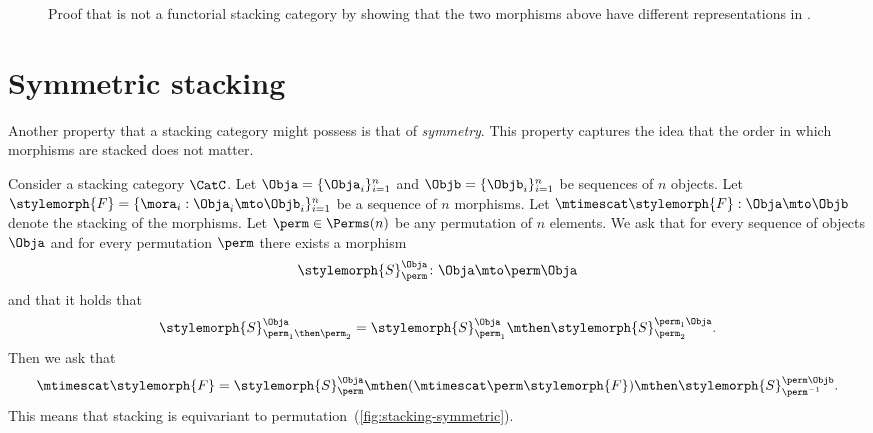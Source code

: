 \begin{figure*}[b]
	\centering
	\caption{Proof that \Effects is not a functorial stacking category by showing that
		the two morphisms above have different representations in \SetL.}
	\label{fig:effects-non-functorial}
\end{figure*}

\section{Symmetric stacking}

Another property that a stacking category might possess is that of \emph{symmetry}.
This property captures the idea that the order in which morphisms are stacked does not matter.

\begin{ctdefinition}
	\label{def:symmetric-stacking-category}
	Consider a stacking category $\CatC$.
	Let $\Obja = \{\Obja_i\}_{i=1}^n$ and $\Objb = \{\Objb_i\}_{i=1}^n$ be sequences of $n$ objects.
	Let $\stylemorph{F} = \{\mora_i : \Obja_i \mto  \Objb_i   \}_{i=1}^n$ be a sequence of $n$ morphisms.
	Let $\mtimescat \stylemorph{F}: \Obja \mto \Objb$ denote the stacking of the morphisms.
	Let $\perm\in\Perms(n)$ be any permutation of $n$ elements.
	We ask that for every sequence of objects $\Obja$ and for every permutation $\perm$ there exists a morphism
	\begin{equation}
		\stylemorph{S}^{\Obja}_\perm \colon \Obja \mto \perm  \Obja
	\end{equation}
	and that it holds that
	\begin{equation}
		\stylemorph{S}_{\perm_1 \then \perm_2}^{\Obja}
		=
		\stylemorph{S}_{\perm_1}^{\Obja} \mthen
		\stylemorph{S}_{\perm_2}^{\perm_1 \Obja} .
	\end{equation}
	Then we ask that
	\begin{equation}
		\label{eq:symmetric-condition}
		\mtimescat \stylemorph{F}  =
		\stylemorph{S}^{\Obja}_{\perm}
		\mthen
		(\mtimescat
		\perm \stylemorph{F} )
		\mthen
		\stylemorph{S}^{\perm \Objb}_{\perm^{-1}}.
	\end{equation}
	This means that stacking is equivariant to permutation~(\cref{fig:stacking-symmetric}).
\end{ctdefinition}

